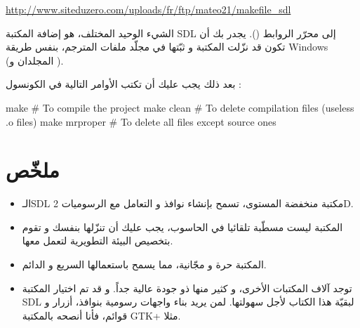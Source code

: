 \url{http://www.siteduzero.com/uploads/fr/ftp/mateo21/makefile_sdl}

الشيء الوحيد المختلف، هو إضافة المكتبة
\textenglish{SDL}
إلى محرّر الروابط
().
يجدر بك أن تكون قد نزّلت المكتبة و ثبّتها في مجلّد ملفات المترجم، بنفس طريقة
\textenglish{Windows}
(المجلدان
و 
).

بعد ذلك يجب عليك أن تكتب الأوامر التالية في الكونسول :

\begin{Console}
make      	# To compile the project
make clean	# To delete compilation files (useless .o files)
make mrproper	# To delete all files except source ones
\end{Console}

\section*{ملخّص}

\begin{itemize}
	\item الـ\textenglish{SDL}
	مكتبة منخفضة المستوى، تسمح بإنشاء نوافذ و التعامل مع الرسوميات
	\textenglish{2D}.
	\item المكتبة ليست مسطّبة تلقائيا في الحاسوب، يجب عليك أن تنزّلها بنفسك و تقوم بتخصيص البيئة التطويرية لتعمل معها.
	\item المكتبة حرة و مجّانية، مما يسمح باستعمالها السريع و الدائم.
	\item توجد آلاف المكتبات الأخرى، و كثير منها ذو جودة عالية جداً. و قد تم اختيار المكتبة 
	\textenglish{SDL}
	لبقيّة هذا الكتاب لأجل سهولتها. لمن يريد بناء واجهات رسومية بنوافذ، أزرار و قوائم، فأنا أنصحه بالمكتبة 
	\textenglish{GTK+}
	مثلا.
\end{itemize}
